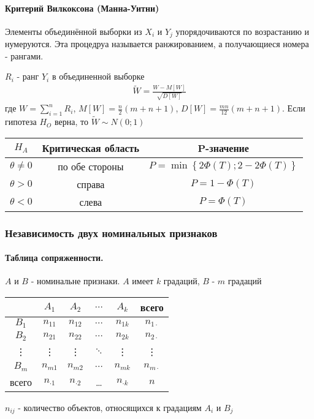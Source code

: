 \documentclass[12pt]{extarticle}
\begin{document}
\paragraph{Критерий Вилкоксона (Манна-Уитни)}
Элементы  объединённой выборки из $X_{i}$ и $Y_{j}$ упорядочиваются по
возрастанию и нумеруются. Эта процедруа называется ранжированием, а
получающиеся номера - рангами.
\par $R_{i}$ - ранг $Y_{i}$ в объединенной выборке
\begin{eqnarray*}
    \widetilde{W}=\frac{W-M[W]}{\sqrt{D[W]}}
\end{eqnarray*}
где $W=\sum\limits_{i=1}^{n}R_{i}$, $M[W] = \frac{n}{2}(m+n+1)$,
$D[W]=\frac{mn}{12}(m+n+1)$. Если гипотеза $H_{O}$ верна, то
$\widetilde{W}\sim N(0;1)$
\begin{center} \begin{tabular}{c|c|c}
    $H_{A}$ & Критическая область & P-значение \\\hline
    $\theta\neq 0$ & по обе стороны &
    $P=\min\left\{2\Phi(T);2-2\Phi(T)\right\}$\\\hline
    $\theta > 0$ & справа & $P=1-\Phi(T)$ \\\hline
    $\theta < 0$ & слева & $P=\Phi(T)$ \\
\end{tabular} \end{center}

\subsubsection{Независимость двух номинальных признаков}
\paragraph{Таблица сопряженности.}
$A$ и $B$ - номинальне признаки. $A$ имеет $k$ градаций, $B$ - $m$
градаций
\begin{center}\begin{tabular}{c|c|c|c|c|c}
            & $A_{1}$ & $A_{2}$ & $\ldots$ & $A_{k}$ & всего \\\hline
    $B_{1}$ & $n_{11}$ & $n_{12}$ & $\ldots$ & $n_{1k}$ & $n_{1\cdot}$\\\hline
    $B_{2}$ & $n_{21}$ & $n_{22}$ & $\ldots$ & $n_{2k}$ & $n_{2\cdot}$\\\hline
    \vdots  & \vdots &\vdots & $\ddots$ &\vdots & \vdots\\\hline
    $B_{m}$ & $n_{m1}$ & $n_{m2}$ & $\ldots$ & $n_{mk}$ & $n_{m\cdot}$\\\hline
    всего & $n_{\cdot 1}$ & $n_{\cdot 2}$ & \ldots & $n_{\cdot k}$ & $n$
\end{tabular}
\end{center}
$n_{ij}$ - количество объектов, относящихся к градациям $A_{i}$ и $B_{j}$
\end{document}
